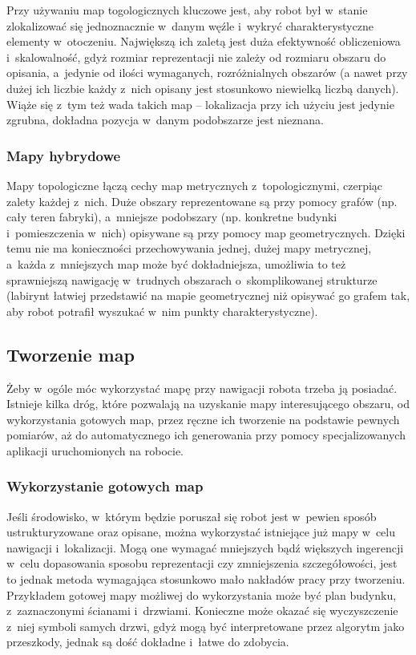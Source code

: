 Przy używaniu map togologicznych kluczowe jest, aby robot był w~stanie zlokalizować
się jednoznacznie w~danym węźle i~wykryć charakterystyczne elementy w~otoczeniu.
Największą ich zaletą jest duża efektywność obliczeniowa i~skalowalność, gdyż rozmiar
reprezentacji nie zależy od rozmiaru obszaru do opisania, a~jedynie od ilości wymaganych,
rozróżnialnych obszarów (a nawet przy dużej ich liczbie każdy z~nich opisany jest
stosunkowo niewielką liczbą danych). Wiąże się z~tym też wada takich map -- lokalizacja
przy ich użyciu jest jedynie zgrubna, dokładna pozycja w~danym podobszarze jest nieznana.

\subsubsection{Mapy hybrydowe}

Mapy topologiczne łączą cechy map metrycznych z~topologicznymi, czerpiąc zalety każdej z~nich.
Duże obszary reprezentowane są przy pomocy grafów (np. cały teren fabryki), a~mniejsze
podobszary (np. konkretne budynki i~pomieszczenia w~nich) opisywane są przy pomocy
map geometrycznych. Dzięki temu nie ma konieczności przechowywania jednej, dużej
mapy metrycznej, a~każda z~mniejszych map może być dokładniejsza, umożliwia to też
sprawniejszą nawigację w~trudnych obszarach o~skomplikowanej strukturze (labirynt
łatwiej przedstawić na mapie geometrycznej niż opisywać go grafem tak, aby robot potrafił
wyszukać w~nim punkty charakterystyczne).

\subsection{Tworzenie map}

Żeby w~ogóle móc wykorzystać mapę przy nawigacji robota trzeba ją posiadać.
Istnieje kilka dróg, które pozwalają na uzyskanie mapy interesującego obszaru,
od wykorzystania gotowych map, przez ręczne ich tworzenie na podstawie pewnych
pomiarów, aż do automatycznego ich generowania przy pomocy specjalizowanych
aplikacji uruchomionych na robocie.

\subsubsection{Wykorzystanie gotowych map}

Jeśli środowisko, w~którym będzie poruszał się robot jest w~pewien sposób
ustrukturyzowane oraz opisane, można wykorzystać istniejące już mapy w~celu
nawigacji i~lokalizacji. Mogą one wymagać mniejszych bądź większych ingerencji
w~celu dopasowania sposobu reprezentacji czy zmniejszenia szczegółowości,
jest to jednak metoda wymagająca stosunkowo mało nakładów pracy przy tworzeniu.
Przykładem gotowej mapy możliwej do wykorzystania może być plan budynku,
z~zaznaczonymi ścianami i~drzwiami. Konieczne może okazać się wyczyszczenie
z~niej symboli samych drzwi, gdyż mogą być interpretowane przez algorytm
jako przeszkody, jednak są dość dokładne i~łatwe do zdobycia.

